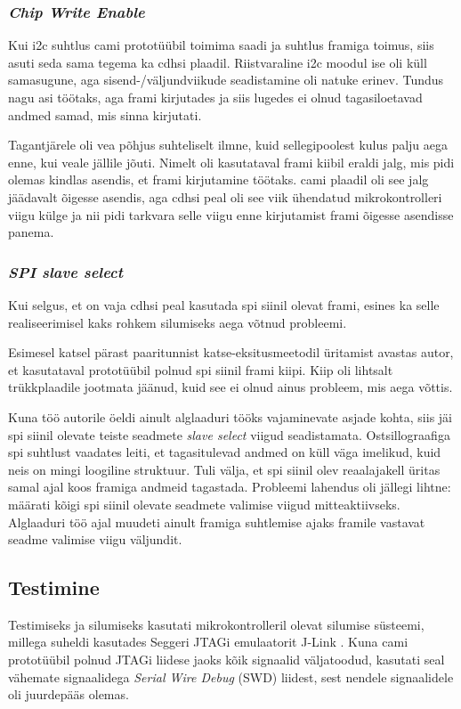 \documentclass[12pt,a4paper]{article}
\begin{document}
\subsubsection{\textit{Chip Write Enable}}
Kui \gls{i2c} suhtlus \gls{cam}i prototüübil toimima saadi ja suhtlus
\gls{fram}iga toimus, siis asuti seda sama tegema ka \gls{cdhs}i plaadil.
Riistvaraline \gls{i2c} moodul ise oli küll samasugune, aga
sisend-/väljundviikude seadistamine oli natuke erinev. Tundus nagu asi töötaks,
aga \gls{fram}i kirjutades ja siis lugedes ei olnud tagasiloetavad andmed samad,
mis sinna kirjutati.

Tagantjärele oli vea põhjus suhteliselt ilmne, kuid sellegipoolest kulus palju
aega enne, kui veale jällile jõuti. Nimelt oli kasutataval \gls{fram}i kiibil
eraldi jalg, mis pidi olemas kindlas asendis, et \gls{fram}i kirjutamine
töötaks. \gls{cam}i plaadil oli see jalg jäädavalt õigesse asendis, aga
\gls{cdhs}i peal oli see viik ühendatud mikrokontrolleri viigu külge ja nii pidi
tarkvara selle viigu enne kirjutamist \gls{fram}i õigesse asendisse panema.

\subsubsection{\textit{SPI slave select}}
Kui selgus, et on vaja \gls{cdhs}i peal kasutada \gls{spi} siinil olevat
\gls{fram}i, esines ka selle realiseerimisel kaks rohkem silumiseks aega võtnud
probleemi. 

Esimesel katsel pärast paaritunnist katse-eksitusmeetodil üritamist avastas
autor, et kasutataval prototüübil polnud \gls{spi} siinil \gls{fram}i kiipi.
Kiip oli lihtsalt trükkplaadile jootmata jäänud, kuid see ei olnud ainus
probleem, mis aega võttis.

Kuna töö autorile öeldi ainult alglaaduri tööks vajaminevate asjade
kohta, siis jäi \gls{spi} siinil olevate teiste seadmete \textit{slave select}
viigud seadistamata. Ostsillograafiga \gls{spi} suhtlust vaadates leiti, et
tagasitulevad andmed on küll väga imelikud, kuid neis on mingi loogiline
struktuur. Tuli välja, et \gls{spi} siinil olev reaalajakell üritas samal ajal
koos \gls{fram}iga andmeid tagastada. Probleemi lahendus oli jällegi lihtne:
määrati kõigi \gls{spi} siinil olevate seadmete valimise viigud mitteaktiivseks.
Alglaaduri töö ajal muudeti ainult \gls{fram}iga suhtlemise ajaks
\gls{fram}ile vastavat seadme valimise viigu väljundit.

\subsection{Testimine}
Testimiseks ja silumiseks kasutati mikrokontrolleril olevat silumise süsteemi,
millega suheldi kasutades Seggeri JTAGi \cite{jtag,jtagwiki} emulaatorit J-Link
\cite{jlink}. Kuna \gls{cam}i prototüübil polnud JTAGi liidese jaoks kõik
signaalid väljatoodud, kasutati seal vähemate signaalidega \textit{Serial Wire
Debug} (SWD) liidest, sest nendele signaalidele oli juurdepääs olemas.
\end{document}
